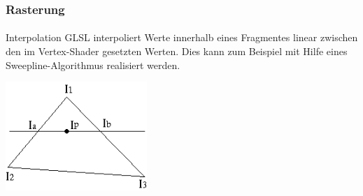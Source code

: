 \documentclass{beamer}
\begin{document}
\begin{frame}
    \frametitle{Rasterung}
\framesubtitle{}
\begin{block}{Interpolation}
GLSL interpoliert Werte innerhalb eines Fragmentes linear zwischen den im Vertex-Shader gesetzten Werten.
Dies kann  zum Beispiel mit Hilfe eines Sweepline-Algorithmus realisiert werden.
\begin{center}
    \includegraphics[width=0.4\textwidth]{images/gouraud_scanline.png}
\end{center}

\end{block}
\end{frame}
\end{document}
